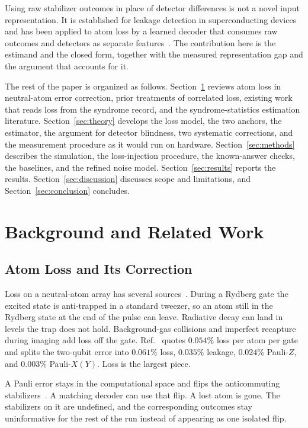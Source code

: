 \documentclass{ieeeaccess}
\begin{document}
Using raw stabilizer outcomes in place of detector differences is not a novel
input representation. It is established for leakage detection in superconducting
devices~\cite{bultink2020repetitiveparity,varbanov2020leakagedetection} and has
been applied to atom loss by a learned decoder that consumes raw outcomes and
detectors as separate features~\cite{wang2026aiqubitloss}. The contribution
here is the estimand and the closed form, together with the measured
representation gap and the argument that accounts for it.

The rest of the paper is organized as follows.
Section~\ref{sec:related} reviews atom loss in neutral-atom error correction,
prior treatments of correlated loss, existing work that reads loss from the
syndrome record, and the syndrome-statistics estimation literature.
Section~\ref{sec:theory} develops the loss model, the two anchors, the
estimator, the argument for detector blindness, two systematic corrections, and the measurement procedure as it would run on hardware.
Section~\ref{sec:methods} describes the simulation, the loss-injection
procedure, the known-answer checks, the baselines, and the refined noise model.
Section~\ref{sec:results} reports the results.
Section~\ref{sec:discussion} discusses scope and limitations, and
Section~\ref{sec:conclusion} concludes.


\section{Background and Related Work}
\label{sec:related}

\subsection{Atom Loss and Its Correction}
\label{sec:rel-loss}

Loss on a neutral-atom array has several sources~\cite{morgado2021rydbergreview}.
During a Rydberg gate the excited state is anti-trapped in a standard tweezer,
so an atom still in the Rydberg state at the end of the pulse can leave.
Radiative decay can land in levels the trap does not hold. Background-gas
collisions and imperfect recapture during imaging add loss off the gate.
Ref.~\cite{evered2026highfidelitygates} quotes $0.054\%$ loss per atom per gate
and splits the two-qubit error into $0.061\%$ loss, $0.035\%$ leakage,
$0.024\%$ Pauli-$Z$, and $0.003\%$ Pauli-$X(Y)$. Loss is the largest piece.

A Pauli error stays in the computational space and flips the anticommuting
stabilizers~\cite{terhal2015qecreview}. A matching decoder can use that flip.
A lost atom is gone. The stabilizers on it are undefined, and the corresponding
outcomes stay uninformative for the rest of the run instead of appearing as one
isolated flip.
\end{document}
